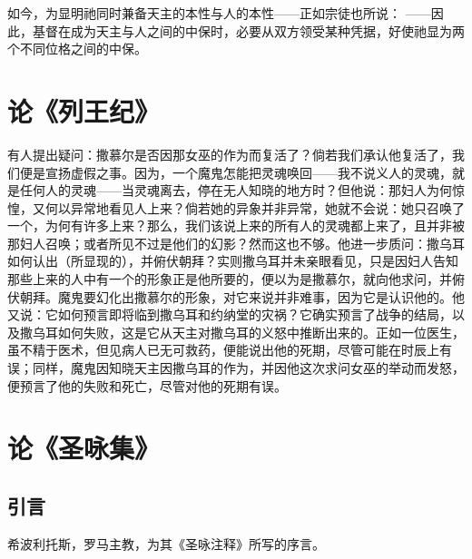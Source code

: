 如今，为显明祂同时兼备天主的本性与人的本性——正如宗徒也所说： ——因此，基督在成为天主与人之间的中保时，必要从双方领受某种凭据，好使祂显为两个不同位格之间的中保。\par


\section{论《列王纪》}

有人提出疑问：撒慕尔是否因那女巫的作为而复活了？倘若我们承认他复活了，我们便是宣扬虚假之事。因为，一个魔鬼怎能把灵魂唤回——我不说义人的灵魂，就是任何人的灵魂——当灵魂离去，停在无人知晓的地方时？但他说：那妇人为何惊惶，又何以异常地看见人上来？倘若她的异象并非异常，她就不会说：她只召唤了一个，为何有许多上来？那么，我们该说上来的所有人的灵魂都上来了，且并非被那妇人召唤；或者所见不过是他们的幻影？然而这也不够。他进一步质问：撒乌耳如何认出（所显现的），并俯伏朝拜？实则撒乌耳并未亲眼看见，只是因妇人告知那些上来的人中有一个的形象正是他所要的，便以为是撒慕尔，就向他求问，并俯伏朝拜。魔鬼要幻化出撒慕尔的形象，对它来说并非难事，因为它是认识他的。他又说：它如何预言即将临到撒乌耳和约纳堂的灾祸？它确实预言了战争的结局，以及撒乌耳如何失败，这是它从天主对撒乌耳的义怒中推断出来的。正如一位医生，虽不精于医术，但见病人已无可救药，便能说出他的死期，尽管可能在时辰上有误；同样，魔鬼因知晓天主因撒乌耳的作为，并因他这次求问女巫的举动而发怒，便预言了他的失败和死亡，尽管对他的死期有误。\par


\section{论《圣咏集》}


\subsection{引言}

希波利托斯，罗马主教，为其《圣咏注释》所写的序言。\par

